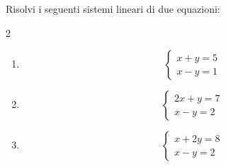 
\begin{question}[ID=1.1, subtitle={Sistemi lineari di due equazioni}, difficulty=facile, tags={sistemi, equazioni lineari}]
Risolvi i seguenti sistemi lineari di due equazioni:
\begin{multicols}{2}
\begin{enumerate}[leftmargin=3.2cm]
    \item
    \[
    \begin{cases}
    x+y=5\\
    x-y=1
    \end{cases}
    \]

    \item
    \[
    \begin{cases}
    2x+y=7\\
    x-y=2
    \end{cases}
    \]

    \item
    \[
    \begin{cases}
    x+2y=8\\
    x-y=2
    \end{cases}
    \]


\end{enumerate}
\end{multicols}
\end{question}
